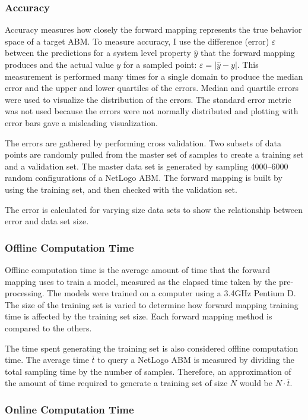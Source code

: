   \subsubsection{Accuracy}
Accuracy measures how closely the forward mapping represents the true behavior space of a target ABM.
To measure accuracy, I use the difference (error) $\varepsilon$ between the predictions for a system level property $\hat y$ that the forward mapping produces and the actual value $y$ for a sampled point: $\varepsilon = |\hat y - y|$.
This measurement is performed many times for a single domain to produce the median error and the upper and lower quartiles of the errors.
Median and quartile errors were used to visualize the distribution of the errors.
The standard error metric was not used because the errors were not normally distributed and plotting with error bars gave a misleading visualization.

The errors are gathered by performing cross validation.
Two subsets of data points are randomly pulled from the master set of samples to create a training set and a validation set.
The master data set is generated by sampling 4000--6000 random configurations of a NetLogo ABM.
The forward mapping is built by using the training set, and then checked with the validation set.

The error is calculated for varying size data sets to show the relationship between error and data set size.

  \subsubsection{Offline Computation Time}

Offline computation time is the average amount of time that the forward mapping uses to train a model, measured as the elapsed time taken by the pre-processing.
The models were trained on a computer using a 3.4GHz Pentium D.
The size of the training set is varied to determine how forward mapping training time is affected by the training set size.
Each forward mapping method is compared to the others.

The time spent generating the training set is also considered offline computation time.
The average time $\bar t$ to query a NetLogo ABM is measured by dividing the total sampling time by the number of samples.
Therefore, an approximation of the amount of time required to generate a training set of size $N$ would be $N \cdot \bar t$.

  \subsubsection{Online Computation Time}

